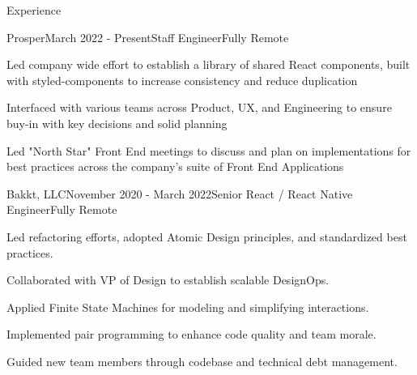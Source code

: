 \documentclass{resume} %
\begin{document}
%
%
\begin{rSection}{Experience}

\begin{rSubsection}{Prosper}{March 2022 - Present}{Staff Engineer}{Fully Remote}
\item Led company wide effort to establish a library of shared React components, built with styled-components to increase consistency and reduce duplication
\item Interfaced with various teams across Product, UX, and Engineering to ensure buy-in with key decisions and solid planning
\item Led "North Star" Front End meetings to discuss and plan on implementations for best practices across the company's suite of Front End Applications
\end{rSubsection}


\begin{rSubsection}{Bakkt, LLC}{November 2020 - March 2022}{Senior React / React Native Engineer}{Fully Remote}
\item Led refactoring efforts, adopted Atomic Design principles, and standardized best practices.
\item Collaborated with VP of Design to establish scalable DesignOps.
\item Applied Finite State Machines for modeling and simplifying interactions.
\item Implemented pair programming to enhance code quality and team morale.
\item Guided new team members through codebase and technical debt management.
\end{rSubsection}



\end{rSection}
\end{document}
